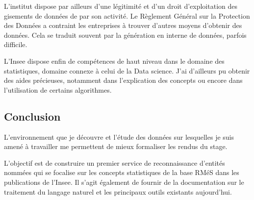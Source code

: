 L'institut dispose par ailleurs d'une légitimité et d'un droit d'exploitation des gisements de données de par son activité. Le Règlement Général sur la Protection des Données a contraint les entreprises à trouver d'autres moyens d'obtenir des données. Cela se traduit souvent par la génération en interne de données, parfois difficile.
\newline

L'Insee dispose enfin de compétences de haut niveau dans le domaine des statistiques, domaine connexe à celui de la Data science. J'ai d'ailleurs pu obtenir des aides précieuses, notamment dans l'explication des concepts ou encore dans l'utilisation de certains algorithmes.
\newline

\subsection*{Conclusion}
L'environnement que je découvre et l'étude des données sur lesquelles je suis amené à travailler me permettent de mieux formaliser les rendus du stage.

L'objectif est de construire un premier service de reconnaissance d'entités nommées qui se focalise sur les concepts statistiques de la base RMéS dans les publications de l'Insee. Il s'agit également de fournir de la documentation sur le traitement du langage naturel et les principaux outils existants aujourd'hui.
